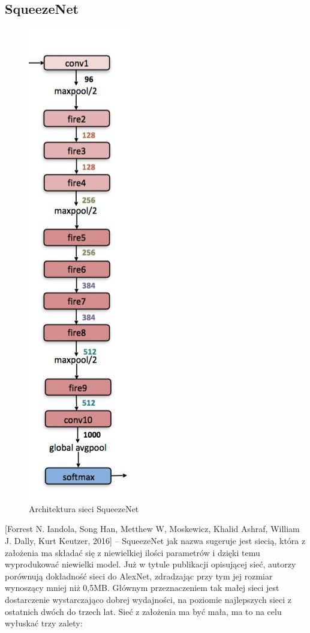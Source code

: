 \documentclass[12pt,a4paper,twoside,titlepage,openright]{book}
\begin{document}
\subsection{SqueezeNet}
\begin{figure}[ht]
	\centering
			\includegraphics[resolution=100, scale=0.65]{SqueezeNet.png}
		\caption{Architektura sieci SqueezeNet}
\end{figure}
[Forrest N. Iandola, Song Han, Metthew W, Moskewicz, Khalid Ashraf, William J. Dally, Kurt Keutzer, 2016] -- SqueezeNet jak nazwa sugeruje jest siecią, która z założenia ma składać się z niewielkiej ilości parametrów i dzięki temu wyprodukować niewielki model. Już w tytule publikacji opisującej sieć, autorzy porównują dokładność sieci do AlexNet, zdradzając przy tym jej rozmiar wynoszący mniej niż 0,5MB. Głównym przeznaczeniem tak małej sieci jest dostarczenie wystarczająco dobrej wydajności, na poziomie najlepszych sieci z ostatnich dwóch do trzech lat. Sieć z założenia ma być mała, ma to na celu wyłuskać trzy zalety:
\end{document}
